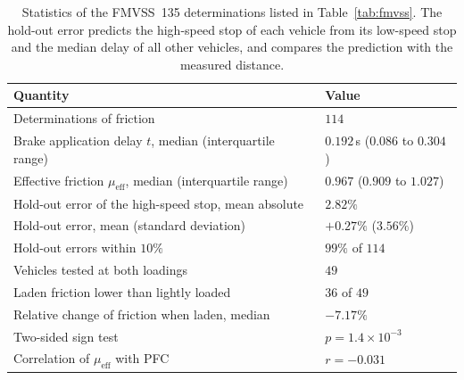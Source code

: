 \documentclass[12pt, twoside]{amsart}
\theoremstyle{definition}
\begin{document}
\begin{table}[htbp]
\centering\small
\caption{Statistics of the FMVSS~135 determinations listed in Table~\ref{tab:fmvss}. The hold-out error predicts the high-speed stop of each vehicle from its low-speed stop and the median delay of all other vehicles, and compares the prediction with the measured distance.}\label{tab:app-fmvss-stats}
\begin{tabular}{>{\raggedright\arraybackslash}p{7.6cm}l}
\toprule
Quantity & Value\\
\midrule
Determinations of friction & $114$\\
Brake application delay $t$, median (interquartile range) & $0.192$\,s ($0.086$ to $0.304$)\\
Effective friction $\mu_{\mathrm{eff}}$, median (interquartile range) & $0.967$ ($0.909$ to $1.027$)\\
Hold-out error of the high-speed stop, mean absolute & $2.82\%$\\
Hold-out error, mean (standard deviation) & $+0.27\%$ ($3.56\%$)\\
Hold-out errors within $10\%$ & $99\%$ of $114$\\
Vehicles tested at both loadings & $49$\\
Laden friction lower than lightly loaded & $36$ of $49$\\
Relative change of friction when laden, median & $-7.17\%$\\
Two-sided sign test & $p=1.4\times10^{-3}$\\
Correlation of $\mu_{\mathrm{eff}}$ with PFC & $r=-0.031$\\
\bottomrule
\end{tabular}
\end{table}
\end{document}
